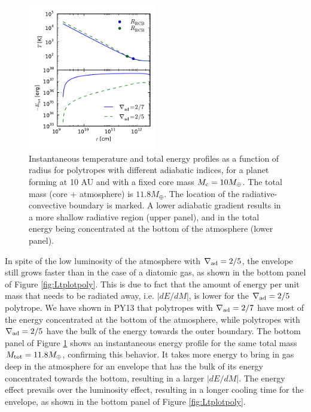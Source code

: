\documentclass[apj]{emulateapj}
\newcommand{\delad}{\nabla_{\rm ad}}
\begin{document}
\begin{figure}[h]
\centering
\includegraphics[width=0.5\textwidth]{../../figs/ModelAtmospheres/RadSelfGravRealEOS/EOSeffects/TErplot_poly.pdf}
\caption{Instantaneous temperature and total energy profiles as a function of radius for polytropes with different adiabatic indices, for a planet forming at 10 AU and with a fixed core mass $M_{\rm c}=10 M_{\oplus}$. The total mass (core + atmosphere) is $11.8 M_{\oplus}$. The location of the radiative-convective boundary is marked. A lower adiabatic gradient results in a more shallow radiative region (upper panel), and in the total energy being concentrated at the bottom of the atmosphere (lower panel).}
\label{fig:ETrplotpoly}
\end{figure}

In spite of the low luminosity of the atmosphere with $\delad=2/5$, the envelope still grows faster than in the case of a diatomic gas, as shown in the bottom panel of Figure \ref{fig:Ltplotpoly}. This is due to fact that the amount of energy per unit mass that needs to be radiated away, i.e. $|dE/dM|$, is lower for the $\delad=2/5$ polytrope. We have shown in PY13 that polytropes with $\delad=2/7$ have most of the energy concentrated at the bottom of the atmosphere, while polytropes with $\delad=2/5$ have the bulk of the energy towards the outer boundary. The bottom panel of Figure \ref{fig:ETrplotpoly} shows an instantaneous energy profile for the same total mass $M_{\rm{tot}} = 11.8 M_{\oplus}$, confirming this behavior. It takes more energy to bring in gas deep in the atmosphere for an envelope that has the bulk of its energy concentrated towards the bottom,  resulting in a larger $|dE/dM|$. The energy effect prevails over the luminosity effect, resulting in a longer cooling time for the envelope, as shown in the bottom panel of Figure \ref{fig:Ltplotpoly}.
\end{document}
